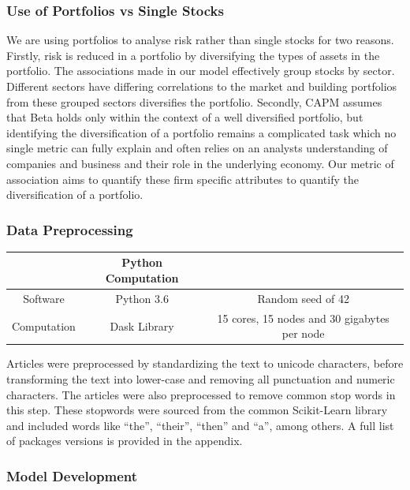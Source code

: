 \documentclass[11pt]{article}
\begin{document}
\hypertarget{use-of-portfolios-vs-single-stocks}{%
\subsubsection{Use of Portfolios vs Single
Stocks}\label{use-of-portfolios-vs-single-stocks}}

We are using portfolios to analyse risk rather than single stocks for
two reasons. Firstly, risk is reduced in a portfolio by diversifying the
types of assets in the portfolio. The associations made in our model
effectively group stocks by sector. Different sectors have differing
correlations to the market and building portfolios from these grouped
sectors diversifies the portfolio. Secondly, CAPM assumes that Beta
holds only within the context of a well diversified portfolio, but
identifying the diversification of a portfolio remains a complicated
task which no single metric can fully explain and often relies on an
analysts understanding of companies and business and their role in the
underlying economy. Our metric of association aims to quantify these
firm specific attributes to quantify the diversification of a portfolio.

\hypertarget{data-preprocessing}{%
\subsubsection{Data Preprocessing}\label{data-preprocessing}}

\begin{longtable}[]{@{}ccc@{}}
\toprule
& \textbf{Python Computation} &\tabularnewline
\midrule
\endhead
Software & Python 3.6 & Random seed of 42\tabularnewline
Computation & Dask Library & 15 cores, 15 nodes and 30 gigabytes per
node\tabularnewline
\bottomrule
\end{longtable}

Articles were preprocessed by standardizing the text to unicode
characters, before transforming the text into lower-case and removing
all punctuation and numeric characters. The articles were also
preprocessed to remove common stop words in this step. These stopwords
were sourced from the common Scikit-Learn library and included words
like ``the'', ``their'', ``then'' and ``a'', among others. A full list
of packages versions is provided in the appendix.

\hypertarget{model-development}{%
\subsubsection{Model Development}\label{model-development}}
\end{document}

